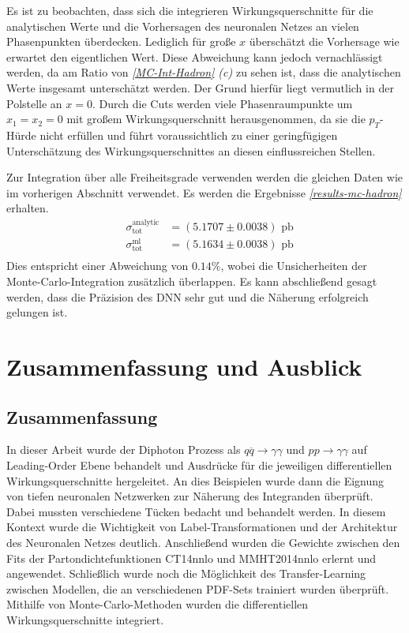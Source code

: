 Es ist zu beobachten, dass sich die integrieren Wirkungsquerschnitte für die analytischen Werte und die Vorhersagen des neuronalen Netzes an vielen Phasenpunkten überdecken. Lediglich für große $x$ überschätzt die Vorhersage wie erwartet den eigentlichen Wert. Diese Abweichung kann jedoch vernachlässigt werden, da am Ratio von \textit{\autoref{MC-Int-Hadron} (c)}  zu sehen ist, dass die analytischen Werte insgesamt unterschätzt werden. Der Grund hierfür liegt vermutlich in der Polstelle an $x=0$. Durch die Cuts werden viele Phasenraumpunkte um $x_1 = x_2 = 0$ mit großem Wirkungsquerschnitt herausgenommen, da sie die $p_T$-Hürde nicht erfüllen und führt voraussichtlich zu einer geringfügigen Unterschätzung des Wirkungsquerschnittes an diesen einflussreichen Stellen. 

Zur Integration über alle Freiheitsgrade verwenden werden die gleichen Daten wie im vorherigen Abschnitt verwendet. Es werden die Ergebnisse \textit{\autoref{results-mc-hadron}} erhalten.
\begin{equation}
\begin{aligned}
&\sigma_{\text{tot}}^{\text{analytic}}&=  (5.1707 \pm 0.0038) \text{ pb}\\
&\sigma_{\text{tot}}^{\text{ml}} &= (5.1634 \pm 0.0038) \text{ pb} \\
\label{results-mc-hadron}
\end{aligned}
\end{equation}
Dies entspricht einer Abweichung von $0.14\%$, wobei die Unsicherheiten der Monte-Carlo-Integration zusätzlich überlappen. Es kann abschließend gesagt werden, dass die Präzision des DNN sehr gut und die Näherung erfolgreich gelungen ist.   
\chapter{Zusammenfassung und Ausblick}
\label{5}
\section{Zusammenfassung}
In dieser Arbeit wurde der Diphoton Prozess als $q\overline{q} \rightarrow \gamma \gamma$ und $pp \rightarrow \gamma \gamma$ auf Leading-Order Ebene behandelt und Ausdrücke für die jeweiligen differentiellen Wirkungsquerschnitte hergeleitet. An dies Beispielen wurde dann die Eignung von tiefen neuronalen Netzwerken zur Näherung des Integranden überprüft. Dabei mussten verschiedene Tücken bedacht und behandelt werden. In diesem Kontext wurde die Wichtigkeit von Label-Transformationen und der Architektur des Neuronalen Netzes deutlich. Anschließend wurden die Gewichte zwischen den Fits der Partondichtefunktionen CT14nnlo und MMHT2014nnlo erlernt und angewendet. Schließlich wurde noch die Möglichkeit des Transfer-Learning zwischen Modellen, die an verschiedenen PDF-Sets trainiert wurden überprüft. Mithilfe von Monte-Carlo-Methoden wurden die differentiellen Wirkungsquerschnitte integriert.

